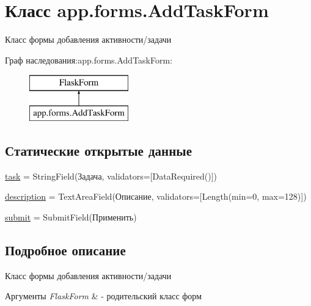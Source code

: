 \hypertarget{classapp_1_1forms_1_1_add_task_form}{}\section{Класс app.\+forms.\+Add\+Task\+Form}
\label{classapp_1_1forms_1_1_add_task_form}


Класс формы добавления активности/задачи  


Граф наследования\+:app.\+forms.\+Add\+Task\+Form\+:\begin{figure}[H]
\begin{center}
\leavevmode
\includegraphics[height=2.000000cm]{classapp_1_1forms_1_1_add_task_form}
\end{center}
\end{figure}
\subsection*{Статические открытые данные}
\begin{DoxyCompactItemize}
\item 
\mbox{\hyperlink{classapp_1_1forms_1_1_add_task_form_a20d3287e025df1bbd1189f5ca5e15d02}{task}} = String\+Field(\textquotesingle{}Задача\textquotesingle{}, validators=\mbox{[}Data\+Required()\mbox{]})
\item 
\mbox{\hyperlink{classapp_1_1forms_1_1_add_task_form_a76e2252402514e3e629b38f0a5bdf37c}{description}} = Text\+Area\+Field(\textquotesingle{}Описание\textquotesingle{}, validators=\mbox{[}Length(min=0, max=128)\mbox{]})
\item 
\mbox{\hyperlink{classapp_1_1forms_1_1_add_task_form_a3ddf0f272307edab62e8855f00a235dc}{submit}} = Submit\+Field(\textquotesingle{}Применить\textquotesingle{})
\end{DoxyCompactItemize}


\subsection{Подробное описание}
Класс формы добавления активности/задачи 


\begin{DoxyParams}{Аргументы}
{\em Flask\+Form} & -\/ родительский класс форм \\
\hline
\end{DoxyParams}


